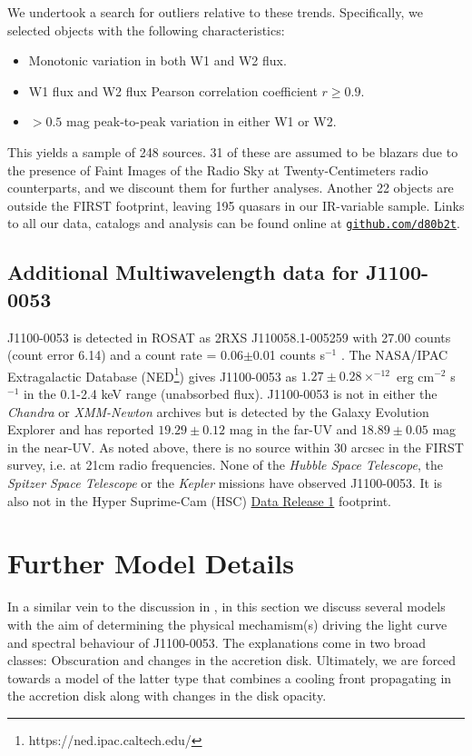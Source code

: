 \documentclass[11pt,a4paper]{article}
\begin{document}
We undertook a search for outliers relative to these
trends. Specifically, we selected objects with the following
characteristics:
\begin{itemize}
  \item Monotonic variation in both W1 and W2 flux.
  \item W1 flux and W2 flux Pearson correlation coefficient $r \geq0.9$.
  \item $>0.5$ mag peak-to-peak variation in either W1 or W2.
\end{itemize}
This yields a sample of 248 sources. 31 of these are assumed to be
blazars due to the presence of Faint Images of the Radio Sky at
Twenty-Centimeters \citep[FIRST; ][]{Becker1995} radio counterparts,
and we discount them for further analyses. Another 22 objects are
outside the FIRST footprint, leaving 195 quasars in our IR-variable
sample. Links to all our data, catalogs and analysis can be found
online at \href{https://github.com/d80b2t}{{\tt github.com/d80b2t}}.


\subsection{Additional Multiwavelength data for J1100-0053}
J1100-0053 is detected in ROSAT as 2RXS J110058.1-005259 with 27.00
counts (count error 6.14) and a count rate = 0.06$\pm$0.01 counts
s$^{-1}$ \cite{Boller2016}. The NASA/IPAC Extragalactic Database
(NED\footnote{https://ned.ipac.caltech.edu/}) gives J1100-0053 as
$1.27\pm0.28 \times^{-12}$ erg cm$^{-2}$ s$^{-1}$ in the 0.1-2.4 keV
range (unabsorbed flux). J1100-0053 is not in either the {\it Chandra}
or {\it XMM-Newton} archives but is detected by the Galaxy Evolution
Explorer \citep[GALEX; ][]{Martin2005, Morrissey2007} and has reported
$19.29\pm0.12$ mag in the far-UV and $18.89\pm0.05$ mag in the
near-UV. As noted above, there is no source within 30 arcsec in the
FIRST survey, i.e. at 21cm radio frequencies. None of the {\it Hubble
Space Telescope}, the {\it Spitzer Space Telescope} or the {\it
Kepler} missions have observed J1100-0053.  It is also not in the
Hyper Suprime-Cam (HSC)
\href{https://hsc-release.mtk.nao.ac.jp/doc/}{Data Release 1}
\citep{Aihara2017} footprint.



\section{Further Model Details}
In a similar vein to the discussion in \cite{Stern2018}, in this
section we discuss several models with the aim of determining the
physical mechamism(s) driving the light curve and spectral behaviour
of J1100-0053. The explanations come in two broad classes: Obscuration
and changes in the accretion disk.  Ultimately, we are forced towards
a model of the latter type that combines a cooling front propagating
in the accretion disk along with changes in the disk opacity.
\end{document}
